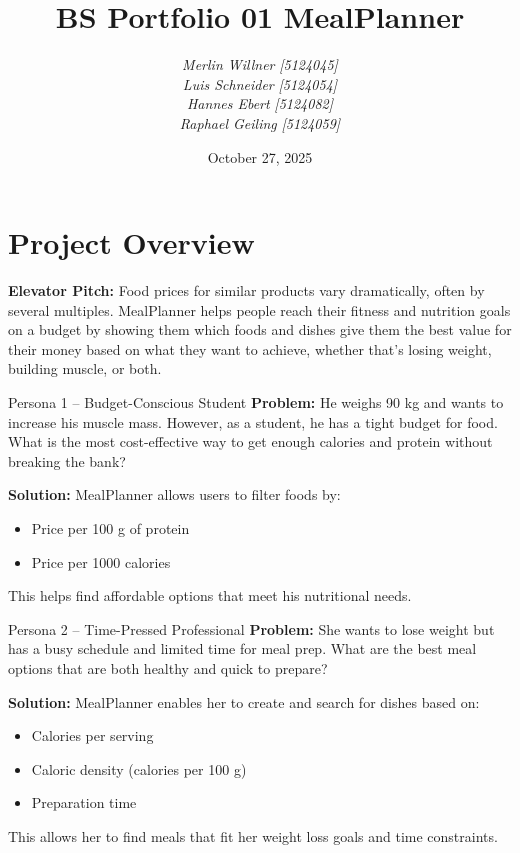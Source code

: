 \documentclass[11pt]{article}
\title{BS Portfolio 01 MealPlanner}
\author{
  \textit{Merlin Willner} \textit{[5124045]}\\
  \textit{Luis Schneider} \textit{[5124054]}\\
  \textit{Hannes Ebert} \textit{[5124082]}\\
  \textit{Raphael Geiling} \textit{[5124059]}
}
\date{October 27, 2025}
\begin{document}
\maketitle

\section{Project Overview}

\textbf{Elevator Pitch:} Food prices for similar products vary dramatically, often by several multiples. 
MealPlanner helps people reach their fitness and nutrition goals on a budget by showing them which foods and dishes give them the best value for their money based on what they want to achieve, whether that's losing weight, building muscle, or both.

\begin{personabox}{Persona 1 -- Budget-Conscious Student}
\textbf{Problem:} He weighs 90 kg and wants to increase his muscle mass. However, as a student, he has a tight budget for food. 
What is the most cost-effective way to get enough calories and protein without breaking the bank?

\textbf{Solution:} MealPlanner allows users to filter foods by:
\begin{itemize}[noitemsep]
  \item Price per 100 g of protein
  \item Price per 1000 calories
\end{itemize}
This helps find affordable options that meet his nutritional needs.
\end{personabox}

\begin{personabox}{Persona 2 -- Time-Pressed Professional}
\textbf{Problem:} She wants to lose weight but has a busy schedule and limited time for meal prep. What are the best meal options that are both healthy and quick to prepare?

\textbf{Solution:} MealPlanner enables her to create and search for dishes based on:
\begin{itemize}[noitemsep]
  \item Calories per serving
  \item Caloric density (calories per 100 g)
  \item Preparation time
\end{itemize}
This allows her to find meals that fit her weight loss goals and time constraints.
\end{personabox}
\end{document}
